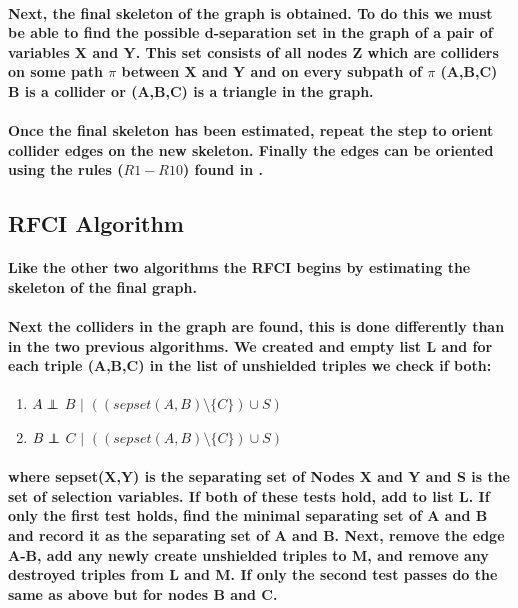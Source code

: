 \documentclass{article}
\newcommand\independent{\protect\mathpalette{\protect\independenT}{\perp}}
\def\independenT#1#2{\mathrel{\rlap{$#1#2$}\mkern2mu{#1#2}}}
\begin{document}
\paragraph{Next, the final skeleton of the graph is obtained. To do this we must be able to find the possible d-separation set in the graph of a pair of variables X and Y. This set consists of all nodes Z which are colliders on some path $\pi$ between X and Y and on every subpath of $\pi$ (A,B,C) B is a collider or (A,B,C) is a triangle in the graph.}

\paragraph{Once the final skeleton has been estimated, repeat the step to orient collider edges on the new skeleton. Finally the edges can be oriented using the rules ($R1-R10$) found in \cite{ZHANG20081873}.\cite{colombo2012learning}}

\subsection{RFCI Algorithm}
\paragraph{Like the other two algorithms the RFCI begins by estimating the skeleton of the final graph. }
\paragraph{Next the colliders in the graph are found, this is done differently than in the two previous algorithms. We created and empty list L and for each triple (A,B,C) in the list of unshielded triples we check if both:}
\begin{enumerate}[i]
	\item $A \independent$ $B$ $|$ $((sepset(A,B) \setminus \{C\})\cup S)$
	\item $B \independent$ $C$ $|$ $((sepset(A,B) \setminus \{C\})\cup S)$\end{enumerate}
\paragraph{where sepset(X,Y) is the separating set of Nodes X and Y and S is the set of selection variables. If both of these tests hold, add to list L. If only the first test holds, find the minimal separating set of A and B and record it as the separating set of A and B. Next, remove the edge A-B, add any newly create unshielded triples to M, and remove any destroyed triples from L and M. If only the second test passes do the same as above but for nodes B and C.}
\end{document}
